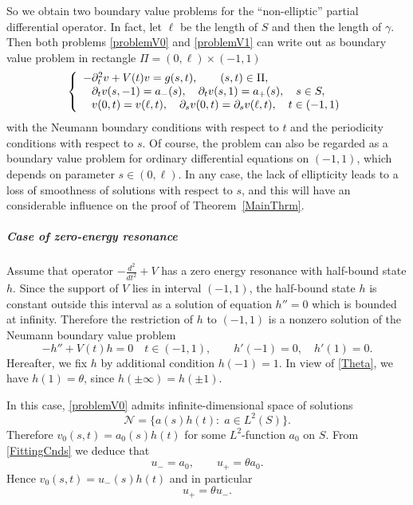 So we obtain two boundary value problems for the ``non-ellip\-tic'' partial differential operator.
In fact, let $\ell$ be the length of $S$ and then the length of $\gamma$. Then both problems \eqref{problemV0} and  \eqref{problemV1} can write out as  boundary value problem in  rectangle $\Pi=(0,\ell)\times(-1,1)$
$$
\left\{
  \begin{array}{ll}
    -\partial_t^2 v+V(t)v=g(s,t), \qquad (s,t)\in \Pi, \\
    \phantom{-}\partial_t v(s,- 1)=a_-(s), \quad \partial_t v(s, 1)=a_+(s), \quad s\in S,\\
\phantom{-}v(0,t)=v(\ell,t), \quad \partial_s v(0,t)=\partial_s v(\ell,t), \quad t\in (-1,1)
  \end{array}
\right.
$$
with the Neumann boundary conditions with respect to $t$ and the periodicity conditions with respect to $s$.
Of course,  the problem can also be  regarded as a boundary value problem for ordinary differential equations on $(-1,1)$, which depends on parameter $s\in (0,\ell)$. In any case, the lack of ellipticity  leads to a loss of smoothness of solutions with respect to $s$, and this will have an considerable influence on the proof of Theorem~\ref{MainThrm}.







\subparagraph{Case of zero-energy resonance}
Assume that operator $-\frac{d^2}{dt^2}+V$ has a zero energy resonance with half-bound state $h$. Since the support of $V$ lies in  interval $(-1,1)$, the half-bound state $h$ is  constant  outside this interval as a solution of equation $h''=0$ which is bounded at infinity.
Therefore the restriction of $h$ to $(-1,1)$ is a nonzero solution of the Neumann boundary value problem
\begin{equation}\label{NeumanProblem}
     -h''+V(t)h= 0\quad t\in(-1,1),\qquad   h'(-1)=0, \quad h'(1)=0.
\end{equation}
Hereafter, we fix $h$ by additional condition $h(-1)=1$. In view of
\eqref{Theta}, we have $h(1)=\theta$, since $h(\pm\infty)=h(\pm 1)$.




In this case, \eqref{problemV0}  admits infinite-dimensional space of solutions
$$
\mathcal{N}=\big\{a(s)h(t)\colon \;a\in L^2(S)\big\}.
$$
Therefore $v_0(s,t)=a_0(s)h(t)$ for some $L^2$-function $a_0$ on $S$. From \eqref{FittingCnds} we deduce that
$$
   u_-=a_0, \qquad u_+=\theta a_0.
$$
Hence $v_0(s,t)=u_-(s)h(t)$ and  in particular
\begin{equation}\label{RCond0}
     u_+=\theta u_-.
\end{equation}

